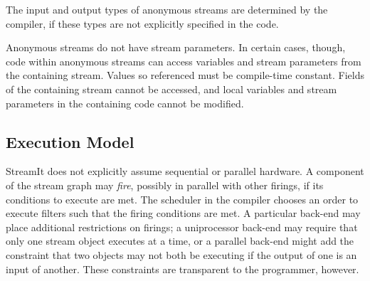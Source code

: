 \documentclass[11pt]{article}
\begin{document}
The input and output types of anonymous streams are determined by the
compiler, if these types are not explicitly specified in the code.

Anonymous streams do not have stream parameters.  In certain cases,
though, code within anonymous streams can access variables and stream
parameters from the containing stream.  Values so referenced must be
compile-time constant.  Fields of the containing stream cannot be
accessed, and local variables and stream parameters in the containing
code cannot be modified.

\subsection{Execution Model}

StreamIt does not explicitly assume sequential or parallel hardware.
A component of the stream graph may \emph{fire}, possibly in parallel
with other firings, if its conditions to execute are met.  The
scheduler in the compiler chooses an order to execute filters such
that the firing conditions are met.  A particular back-end may place
additional restrictions on firings; a uniprocessor back-end may
require that only one stream object executes at a time, or a parallel
back-end might add the constraint that two objects may not both be
executing if the output of one is an input of another.  These
constraints are transparent to the programmer, however.
\end{document}
